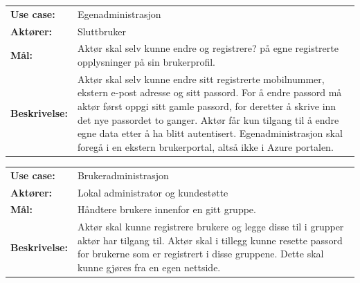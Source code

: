 \begin{framed}
    \begin{tabular}{l p{9cm}}
        \textbf{Use case:} & Egenadministrasjon \\
        \textbf{Aktører:} & Sluttbruker 
        \bigskip \\
        \textbf{Mål:} & Aktør skal selv kunne endre {\color{red}og registrere?} på egne registrerte opplysninger på sin brukerprofil. 
        \bigskip \\
        \textbf{Beskrivelse:} &  Aktør skal selv kunne endre sitt registrerte mobilnummer, ekstern e-post adresse og sitt passord. For å endre passord må aktør først oppgi sitt gamle passord, for deretter å skrive inn det nye passordet to ganger. Aktør får kun tilgang til å endre egne data etter å ha blitt autentisert. Egenadministrasjon skal foregå i en ekstern brukerportal, altså ikke i Azure portalen.
    \end{tabular}
\end{framed}

\begin{framed}
    \begin{tabular}{l p{9cm}}
        \textbf{Use case:} & Brukeradministrasjon \\
        \textbf{Aktører:} & Lokal administrator og kundestøtte 
        \bigskip \\
        \textbf{Mål:} & Håndtere brukere innenfor en gitt gruppe.  
        \bigskip \\
        \textbf{Beskrivelse:} & Aktør skal kunne registrere brukere og legge disse til i grupper aktør har tilgang til. Aktør skal i tillegg kunne resette passord for brukerne som er registrert i disse gruppene. Dette skal kunne gjøres fra en egen nettside.
    \end{tabular}
\end{framed}

